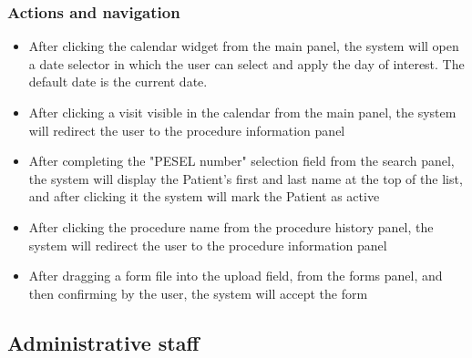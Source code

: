 \subsubsection{Actions and navigation}
\begin{itemize}
    \item After clicking the calendar widget from the main panel, the system will open a date selector in which the user can select and apply the day of interest. The default date is the current date.
    \item After clicking a visit visible in the calendar from the main panel, the system will redirect the user to the procedure information panel
    \item After completing the "PESEL number" selection field from the search panel, the system will display the Patient's first and last name at the top of the list, and after clicking it the system will mark the Patient as active
    \item After clicking the procedure name from the procedure history panel, the system will redirect the user to the procedure information panel
    \item After dragging a form file into the upload field, from the forms panel, and then confirming by the user, the system will accept the form
    \end{itemize}

\subsection{Administrative staff}

